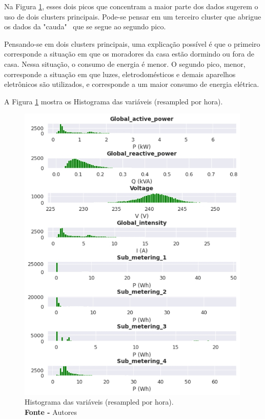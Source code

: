 Na Figura \ref{fig: Histograma das variáveis (resampled por hora)}, esses dois picos que concentram a maior parte dos dados sugerem o uso de dois clusters principais. Pode-se pensar em um terceiro cluster que abrigue os dados da "cauda" \ que se segue ao segundo pico.

Pensando-se em dois clusters principais, uma explicação possível é que o primeiro corresponde a situação em que os moradores da casa estão dormindo ou fora de casa. Nessa situação, o consumo de energia é menor. O segundo pico, menor, corresponde a situação em que luzes, eletrodomésticos e demais aparelhos eletrônicos são utilizados, e corresponde a um maior consumo de energia elétrica.

A Figura \ref{fig: Histograma das variáveis (resampled por hora)} mostra os Histograma das variáveis (resampled por hora).
\begin{figure}[H]
    \centering
    \includegraphics[width=0.99\textwidth]{Figuras/4. Resultados e Discussões/Exer4/Histograma das variáveis (resampled por hora).jpg}
    \caption{Histograma das variáveis (resampled por hora).\\ \textbf{Fonte -} Autores}
    \label{fig: Histograma das variáveis (resampled por hora)}
\end{figure}


